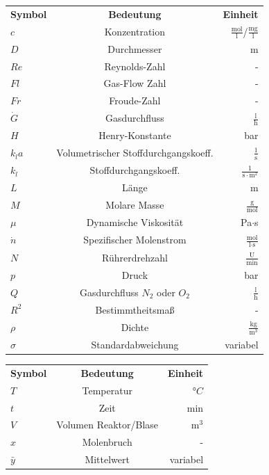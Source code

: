 \documentclass[12pt,liststotoc]{report}
\begin{document}
\begin{table}[h]
\begin{center}
\renewcommand{\arraystretch}{1.5}
\setlength{\tabcolsep}{9mm}
\begin{tabular}{lcr}
\textbf{Symbol} & \textbf{Bedeutung} & \textbf{Einheit}\\
$c$ & Konzentration & $\frac{\text{mol}}{\text{l}}$/$\frac{\text{mg}}{\text{l}}$  \\
$D$ & Durchmesser & m \\
$Re$ & Reynolds-Zahl & - \\
$Fl$ & Gas-Flow Zahl & - \\
$Fr$ & Froude-Zahl & - \\
$\dot{G}$ & Gasdurchfluss & $\frac{\text{l}}{\text{h}}$ \\
$H$ & Henry-Konstante & bar \\
$k_la$ & Volumetrischer Stoffdurchgangskoeff. & $\frac{1}{\text{s}}$ \\
$k_l$ & Stoffdurchgangskoeff. & $\frac{1}{\text{s}\cdot\text{m}^2}$ \\
$L$ & Länge & m \\
$M$ & Molare Masse & $\frac{\text{g}}{\text{mol}}$ \\
$\mu$ & Dynamische Viskosität & Pa$\cdot$s \\
$\dot{n}$ & Spezifischer Molenstrom & $\frac{\text{mol}}{\text{l}\cdot\text{s}}$ \\
$N$ & Rührerdrehzahl & $\frac{\text{U}}{\text{min}}$ \\
$p$ & Druck & bar \\
$Q$ & Gasdurchfluss $N_2$ oder $O_2$ & $\frac{\text{l}}{\text{h}}$ \\
$R^2$ & Bestimmtheitsmaß & - \\
$\rho$ & Dichte & $\frac{\text{kg}}{\text{m}^3}$ \\
$\sigma$ & Standardabweichung & variabel \\
\end{tabular}
\end{center}
\end{table}

\begin{table}[h]
\begin{center}
\renewcommand{\arraystretch}{1.5}
\setlength{\tabcolsep}{9mm}
\begin{tabular}{lcr}
\textbf{Symbol} & \textbf{Bedeutung} & \textbf{Einheit}\\
$T$ & Temperatur & °$C$ \\
$t$ & Zeit & min \\
$V$ & Volumen Reaktor/Blase & m$^3$ \\
$x$ & Molenbruch & - \\
$\bar{y}$ & Mittelwert & variabel \\
\end{tabular}
\end{center}
\end{table}
\end{document}
